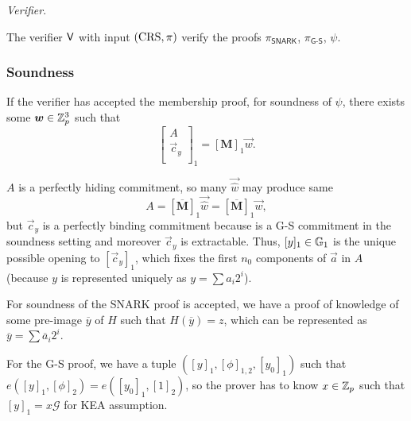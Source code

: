 \noindent \textit{Verifier}. 

The verifier $\mathsf{V}$ with input $(\textnormal{CRS},\pi)$ verify the proofs $\pi_{\textsf{SNARK}}$, $\pi_{\textsf{G-S}}$, $\psi$.

\subsubsection*{Soundness}

If the verifier has accepted the membership proof, for soundness of $\psi$, there exists some $\vec{w} \in \Z_p^3$ such that
$$\left[\begin{array}{c}
A\\
\vec{c}_y\\
\end{array}\right]_1 = \left[\mathbf{M}\right]_1 \vec{w}.$$

$A$ is a perfectly hiding commitment, so many $\vec{\hat{w}}$ may produce same 
$$A=\left[\overline{\mathbf{M}}\right]_1\vec{\hat{w}}=\left[\overline{\mathbf{M}}\right]_1\vec{w},$$
 but $\vec{c}_y$ is a perfectly binding commitment because is a G-S commitment in the soundness setting and moreover $\vec{c}_y$ is extractable. Thus, $[y]_1 \in \mathbb{G}_1$ is the unique possible opening to $[\vec{c}_y]_1$, which fixes the first $n_0$ components of $\vec{a}$ in $A$ (because $y$ is represented uniquely as $y=\sum a_i 2^i$).

For soundness of the SNARK proof is accepted, we have a proof of knowledge of some pre-image $\overline{y}$ of $H$ such that $H(\overline{y})=z$, which can be represented as $\overline{y} = \sum \overline{a}_i 2^i$.

For the G-S proof, we have a tuple $([y]_1,[\phi]_{1,2},[y_0]_1)$ such that $e([y]_1, [\phi]_2) =e([y_0]_1,[1]_2)$, so the prover has to know $x \in \mathbb{Z}_p$ such that $[y]_1 = x \mathcal{G}$ for KEA assumption.

